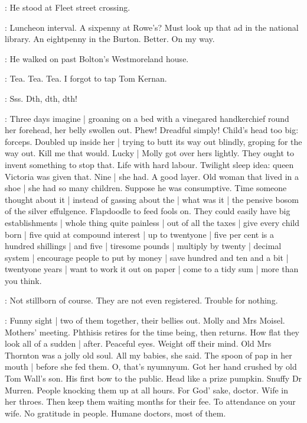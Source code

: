 :
He stood at Fleet street crossing.

\BloomInt:
Luncheon interval.
A sixpenny at Rowe's?
Must look up that ad in the national library.
An eightpenny in the Burton.
Better.
On my way.

:
He walked on past Bolton's Westmoreland house.

\BloomInt:
Tea.
Tea.
Tea.
I forgot to tap Tom Kernan.

\Bloom:
Sss.
Dth, dth, dth!

\BloomInt:
Three days imagine |
groaning on a bed with a vinegared handkerchief round her forehead,
her belly swollen out.
Phew!
Dreadful simply!
Child's head too big:
forceps.
Doubled up inside her |
trying to butt its way out blindly,
groping for the way out.
Kill me that would.
Lucky |
Molly got over hers lightly.
They ought to invent something to stop that.
Life with hard labour.
Twilight sleep idea:
queen Victoria was given that.
Nine |
she had.
A good layer.
Old woman that lived in a shoe |
she had so many children.
Suppose he was consumptive.
Time someone thought about it |
instead of gassing about the |
what was it |
the pensive bosom of the silver effulgence.
Flapdoodle to feed fools on.
They could easily have big establishments |
whole thing quite painless |
out of all the taxes |
give every child born |
five quid at compound interest |
up to twentyone |
five per cent is a hundred shillings |
and five |
tiresome pounds |
multiply by twenty |
decimal system |
encourage people to put by money |
save hundred and ten and a bit |
twentyone years |
want to work it out on paper |
come to a tidy sum |
more than you think.

\BloomInt:
Not stillborn of course.
They are not even registered.
Trouble for nothing.%

\BloomInt:
Funny sight |
two of them together,
their bellies out.
Molly and Mrs Moisel.
Mothers' meeting.
Phthisis retires for the time being,
then returns.
How flat they look all of a sudden |
after.
Peaceful eyes.
Weight off their mind.
Old Mrs Thornton was a jolly old soul.
All my babies,
she said.
The spoon of pap in her mouth |
before she fed them.
O, that's nyumnyum.
Got her hand crushed by old Tom Wall's son.
His first bow to the public.
Head like a prize pumpkin.
Snuffy Dr Murren.
People knocking them up at all hours.
For God' sake, doctor.
Wife in her throes.
Then keep them waiting months for their fee.
To attendance on your wife.
No gratitude in people.
Humane doctors,
most of them.

